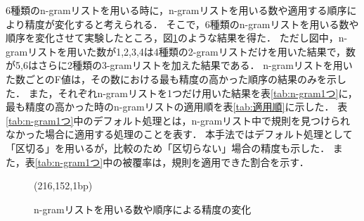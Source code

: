 6種類のn-gramリストを用いる時に，n-gramリストを用いる数や適用する順序により精度が変化すると考えられる．
そこで，6種類のn-gramリストを用いる数や順序を変化させて実験したところ，図\ref{fig:n-gramの数}のような結果を得た．
ただし図中，n-gramリストを用いた数が1,2,3,4は4種類の2-gramリストだけを用いた結果で，数が5,6はさらに2種類の3-gramリストを加えた結果である．
n-gramリストを用いた数ごとのF値は，その数における最も精度の高かった順序の結果のみを示した．
また，それぞれn-gramリストを1つだけ用いた結果を表\ref{tab:n-gram1つ}に，最も精度の高かった時のn-gramリストの適用順を表\ref{tab:適用順}に示した．
表\ref{tab:n-gram1つ}中のデフォルト処理とは，n-gramリスト中で規則を見つけられなかった場合に適用する処理のことを表す．
本手法ではデフォルト処理として「区切る」を用いるが，比較のため「区切らない」場合の精度も示した．
また，表\ref{tab:n-gram1つ}中の被覆率は，規則を適用できた割合を示す．

\begin{figure}
  \begin{center}
    \begin{epsf}
    \end{epsf}
    \begin{draft}
    \atari(216,152,1bp)
    \end{draft}
    \caption{n-gramリストを用いる数や順序による精度の変化}
    
    
    
    \label{fig:n-gramの数}
  \end{center}
\end{figure}

